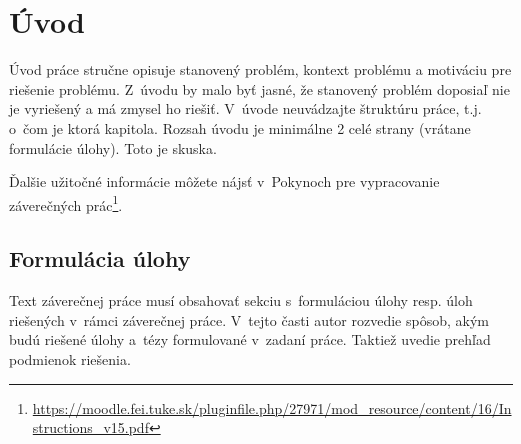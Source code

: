 
{}

\chapter*{Úvod}

Úvod práce stručne opisuje stanovený problém, kontext problému a motiváciu pre riešenie problému. Z~úvodu by malo byť jasné, že stanovený problém doposiaľ nie je vyriešený a má zmysel ho riešiť.
V~úvode neuvádzajte štruktúru práce, t.j. o~čom je ktorá kapitola. Rozsah úvodu je minimálne 2 celé strany (vrátane formulácie úlohy). Toto je skuska.

Ďalšie užitočné informácie môžete nájsť v~Pokynoch pre vypracovanie záverečných prác\footnote{\url{https://moodle.fei.tuke.sk/pluginfile.php/27971/mod_resource/content/16/Instructions_v15.pdf}}.


\section*{Formulácia úlohy}

Text záverečnej práce musí obsahovať sekciu s~formuláciou úlohy resp. úloh riešených v~rámci záverečnej práce. V~tejto časti autor rozvedie spôsob, akým budú riešené úlohy a~tézy formulované v~zadaní práce. Taktiež uvedie prehľad podmienok riešenia.
